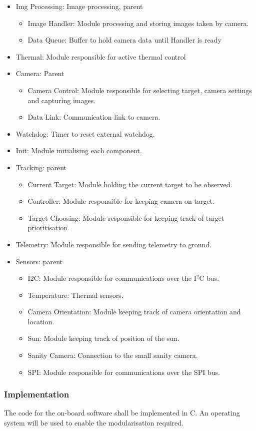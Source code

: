 \begin{itemize}
	\item Img Processing: Image processing, parent
		\begin{itemize}
			\item Image Handler: Module processing and storing images taken by camera.
			\item Data Queue: Buffer to hold camera data until Handler is ready
		\end{itemize}
	\item Thermal: Module responsible for active thermal control
	\item Camera: Parent
		\begin{itemize}
			\item Camera Control: Module responsible for selecting target, camera settings and capturing images.
			\item Data Link: Communication link to camera.
		\end{itemize}
	\item Watchdog: Timer to reset external watchdog.
	\item Init: Module initialising each component.
	\item Tracking: parent
		\begin{itemize}
			\item Current Target: Module holding the current target to be observed.
			\item Controller: Module responsible for keeping camera on target.
			\item Target Choosing: Module responsible for keeping track of target prioritisation.
		\end{itemize}
	\item Telemetry: Module responsible for sending telemetry to ground.
	\item Sensors: parent
		\begin{itemize}
			\item I2C: Module responsible for communications over the I$^2$C bus.
			\item Temperature: Thermal sensors.
			\item Camera Orientation: Module keeping track of camera orientation and location.
			\item Sun: Module keeping track of position of the sun.
			\item Sanity Camera: Connection to the small sanity camera.
			\item SPI: Module responsible for communications over the SPI bus.
		\end{itemize}
		
\end{itemize}

\subsubsection{Implementation}

The code for the on-board software shall be implemented in C. An operating system will be used to enable the modularisation required.

\raggedbottom
